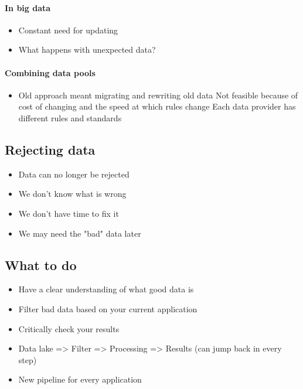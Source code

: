 \documentclass[10pt,a4paper]{scrreprt}
\begin{document}
\paragraph{In big data}
\begin{itemize}
	\item Constant need for updating
	\item What happens with unexpected data?
\end{itemize}
\paragraph{Combining data pools}
\begin{itemize}
	\item Old approach meant migrating and rewriting old data
	\subitem Not feasible because of cost of changing and the speed at which rules change
	\subitem Each data provider has different rules and standards
\end{itemize}


\subsection{Rejecting data}
\begin{itemize}
	\item Data can no longer be rejected
	\item We don't know what is wrong
	\item We don't have time to fix it
	\item We may need the "bad" data later
\end{itemize}

\subsection{What to do}
\begin{itemize}
	\item Have a clear understanding of what good data is
	\item Filter bad data based on your current application
	\item Critically check your results
	\item Data lake => Filter => Processing => Results (can jump back in every step)
	\item New pipeline for every application
\end{itemize}
\end{document}
